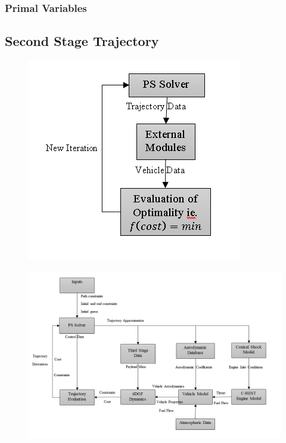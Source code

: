 \subsubsection{Primal Variables}

\subsection{Second Stage Trajectory}

\begin{figure}
	\centering
	\includegraphics[width=0.7\linewidth]{figures/4_LODESTAR/FlowChartSmall}
	\caption{}
	\label{fig:FlowChartSmall}
\end{figure}


\begin{landscape}%
\begin{figure}
\centering
\includegraphics[width=0.9\linewidth]{"figures/4_LODESTAR/Ascent Flowchart"}
\caption{}
\label{fig:AscentFlowchart}
\end{figure} 
\end{landscape}




